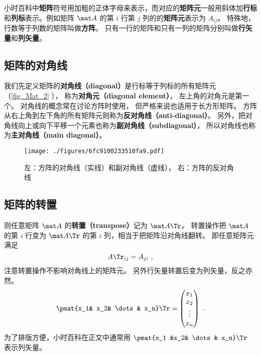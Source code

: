 
\begin{issues}
\end{issues}

小时百科中\textbf{矩阵}符号用加粗的正体字母来表示，而对应的\textbf{矩阵元}一般用斜体加\textbf{行标}和\textbf{列标}表示。例如矩阵 $\mat A$ 的第 $i$ 行第 $j$ 列的的\textbf{矩阵元}表示为 $A_{ij}$。 特殊地， 行数等于列数的矩阵叫做\textbf{方阵}。 只有一行的矩阵和只有一列的矩阵分别叫做\textbf{行矢量}和\textbf{列矢量}。

\subsection{矩阵的对角线}
我们先定义矩阵的\textbf{对角线（diagonal）}是行标等于列标的所有矩阵元（\autoref{fig_Mat_2} ）， 称为\textbf{对角元（diagonal element）}， 左上角的对角元是第一个。 对角线的概念常在讨论方阵时使用， 但严格来说也适用于长方形矩阵。 方阵从右上角到左下角的所有矩阵元则称为\textbf{反对角线（anti-diagonal）}。 另外，把对角线向上或向下平移一个元素也称为\textbf{副对角线（subdiagonal）}， 所以对角线也称为\textbf{主对角线（main diagonal）}。

\begin{figure}[ht]
\centering
\texttt{[image: ./figures/6fc9100233510fa9.pdf]}
\caption{左：方阵的对角线（实线）和副对角线（虚线）， 右：方阵的反对角线} \label{fig_Mat_2}
\end{figure}

\subsection{矩阵的转置}\label{sub_Mat_2}
则任意矩阵 $\mat A$ 的\textbf{转置（transpose）}记为 $\mat A\Tr$。 转置操作把 $\mat A$ 的第 $i$ 行变为 $\mat A\Tr$ 的第 $i$ 列，相当于把矩阵沿对角线翻转。 即任意矩阵元满足
\begin{equation}\label{eq_Mat_3}
A\Tr_{ij} = A_{ji}~,
\end{equation}
注意转置操作不影响对角线上的矩阵元。 另外行矢量转置后变为列矢量，反之亦然。
\begin{equation}\label{eq_Mat_2}
\pmat{x_1& x_2& \dots& x_n}\Tr = \begin{pmatrix} x_1\\x_2\\ \vdots\\x_n \end{pmatrix}~.
\end{equation}
为了排版方便，小时百科在正文中通常用 $\pmat{x_1 &x_2& \dots& x_n}\Tr$ 表示列矢量。

